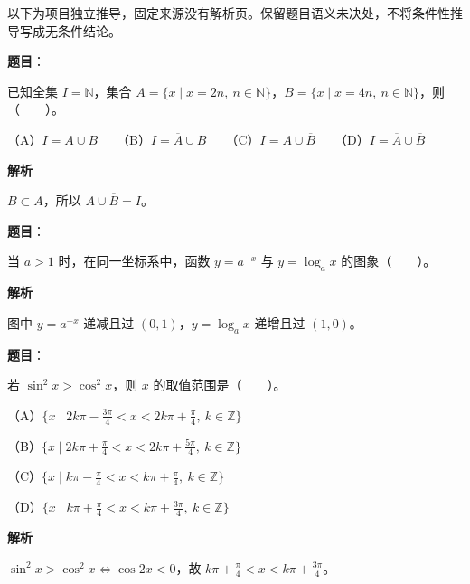 

\begin{gktip}
以下为项目独立推导，固定来源没有解析页。保留题目语义未决处，不将条件性推导写成无条件结论。
\end{gktip}

\begin{answer}

\textbf{题目}：

已知全集 $I=\mathbb{N}$，集合 $A=\{x\mid x=2n,\ n\in\mathbb{N}\}$，$B=\{x\mid x=4n,\ n\in\mathbb{N}\}$，则\mbox{（　　）}。

（A）$I=A\cup B$　　（B）$I=\overline{A}\cup B$　　（C）$I=A\cup\overline{B}$　　（D）$I=\overline{A}\cup\overline{B}$

\textbf{解析}

$B\subset A$，所以 $A\cup\overline B=I$。


\end{answer}
\begin{answer}

\textbf{题目}：

当 $a>1$ 时，在同一坐标系中，函数 $y=a^{-x}$ 与 $y=\log_a x$ 的图象\mbox{（　　）}。
\nopagebreak[4]
\begin{center}\end{center}
\nopagebreak[4]
\textbf{解析}

图中 $y=a^{-x}$ 递减且过 $(0,1)$，$y=\log_a x$ 递增且过 $(1,0)$。


\end{answer}
\begin{answer}

\textbf{题目}：

若 $\sin^2 x>\cos^2 x$，则 $x$ 的取值范围是\mbox{（　　）}。

（A）$\{x\mid 2k\pi-\frac{3\pi}{4}<x<2k\pi+\frac{\pi}{4},\ k\in\mathbb{Z}\}$

（B）$\{x\mid 2k\pi+\frac{\pi}{4}<x<2k\pi+\frac{5\pi}{4},\ k\in\mathbb{Z}\}$

（C）$\{x\mid k\pi-\frac{\pi}{4}<x<k\pi+\frac{\pi}{4},\ k\in\mathbb{Z}\}$

（D）$\{x\mid k\pi+\frac{\pi}{4}<x<k\pi+\frac{3\pi}{4},\ k\in\mathbb{Z}\}$

\textbf{解析}

$\sin^2x>\cos^2x\iff\cos2x<0$，故 $k\pi+\frac\pi4<x<k\pi+\frac{3\pi}4$。


\end{answer}
